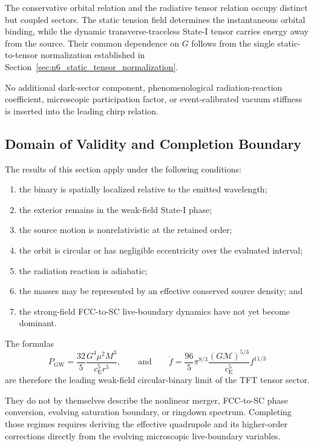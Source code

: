 The conservative orbital relation and the radiative tensor relation occupy distinct but coupled sectors. The static tension field determines the instantaneous orbital binding, while the dynamic transverse-traceless State-I tensor carries energy away from the source. Their common dependence on $G$ follows from the single static-to-tensor normalization established in Section~\ref{sec:n6_static_tensor_normalization}.

No additional dark-sector component, phenomenological radiation-reaction coefficient, microscopic participation factor, or event-calibrated vacuum stiffness is inserted into the leading chirp relation.

\subsection{Domain of Validity and Completion Boundary}
\label{subsec:n10_scope}

The results of this section apply under the following conditions:
\begin{enumerate}
    \item the binary is spatially localized relative to the emitted wavelength;
    \item the exterior remains in the weak-field State-I phase;
    \item the source motion is nonrelativistic at the retained order;
    \item the orbit is circular or has negligible eccentricity over the evaluated interval;
    \item the radiation reaction is adiabatic;
    \item the masses may be represented by an effective conserved source density; and
    \item the strong-field FCC-to-SC live-boundary dynamics have not yet become dominant.
\end{enumerate}

The formulas
\begin{equation}
    P_{\mathrm{GW}} = \frac{32}{5} \frac{ G^{4}\mu^{2}M^{3} }{ c_{\mathrm{E}}^{5}r^{5} }, \qquad \text{and} \qquad \dot{f} = \frac{96}{5} \pi^{8/3} \frac{ \left( G\mathcal{M} \right)^{5/3} }{ c_{\mathrm{E}}^{5} } f^{11/3}
\end{equation}
are therefore the leading weak-field circular-binary limit of the TFT tensor sector.

They do not by themselves describe the nonlinear merger, FCC-to-SC phase conversion, evolving saturation boundary, or ringdown spectrum. Completing those regimes requires deriving the effective quadrupole and its higher-order corrections directly from the evolving microscopic live-boundary variables.

